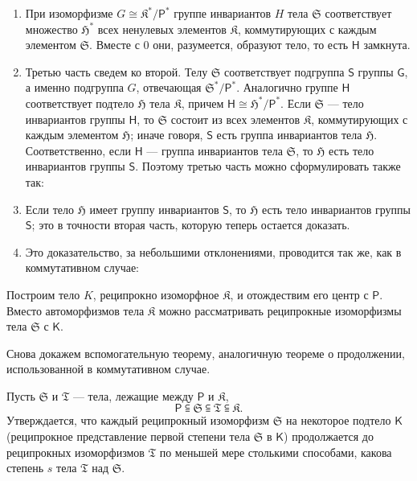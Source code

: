 \documentclass[11pt]{article}
\begin{document}
\begin{enumerate}
\item При изоморфизме \(G\cong \mathfrak K^*/\mathsf P^*\) группе инвариантов \(H\) тела \(\mathfrak S\) соответствует множество \(\mathfrak H^*\) всех ненулевых элементов \(\mathfrak K\), коммутирующих с каждым элементом \(\mathfrak S\). Вместе с 0 они, разумеется, образуют тело, то есть \(\mathsf{H}\) замкнута.

\item Третью часть сведем ко второй. Телу \(\mathfrak S\) соответствует подгруппа \(\mathsf{S}\) группы \(\mathsf{G}\), а именно подгруппа \(G\), отвечающая \(\mathfrak S^*/\mathsf P^*\). Аналогично группе \(\mathsf{H}\) соответствует подтело \(\mathfrak H\) тела \(\mathfrak K\), причем \(\mathsf{H}\cong \mathfrak H^*/\mathsf P^*\). Если \(\mathfrak S\) --- тело инвариантов группы \(\mathsf{H}\), то \(\mathfrak S\) состоит из всех элементов \(\mathfrak K\), коммутирующих с каждым элементом \(\mathfrak H\); иначе говоря, \(\mathsf{S}\) есть группа инвариантов тела \(\mathfrak H\). Соответственно, если \(\mathsf{H}\) --- группа инвариантов тела \(\mathfrak S\), то \(\mathfrak H\) есть тело инвариантов группы \(\mathsf{S}\). Поэтому третью часть можно сформулировать также так:

\item[\(3'\).] Если тело \(\mathfrak H\) имеет группу инвариантов \(\mathsf{S}\), то \(\mathfrak H\) есть тело инвариантов группы \(\mathsf{S}\); это в точности вторая часть, которую теперь остается доказать.

\item[3.] Это доказательство, за небольшими отклонениями, проводится так же, как в коммутативном случае:
\end{enumerate}

Построим тело \(K\), реципрокно изоморфное \(\mathfrak K\), и отождествим его центр с \(\mathsf P\). Вместо автоморфизмов тела \(\mathfrak K\) можно рассматривать реципрокные изоморфизмы тела \(\mathfrak S\) с \(\mathsf{K}\).

Снова докажем вспомогательную теорему, аналогичную теореме о продолжении, использованной в коммутативном случае.

Пусть \(\mathfrak S\) и \(\mathfrak T\) --- тела, лежащие между \(\mathsf P\) и \(\mathfrak K\),
\[
\mathsf P \subseteqq \mathfrak S \subseteqq \mathfrak T \subseteqq \mathfrak K.
\]
Утверждается, что каждый реципрокный изоморфизм \(\mathfrak S\) на некоторое подтело \(\mathsf{K}\) (реципрокное представление первой степени тела \(\mathfrak S\) в \(\mathsf{K}\)) продолжается до реципрокных изоморфизмов \(\mathfrak T\) по меньшей мере столькими способами, какова степень \(s\) тела \(\mathfrak T\) над \(\mathfrak S\).
\end{document}
